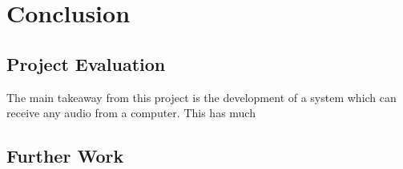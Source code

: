 \documentclass[main.tex]{subfiles}
\begin{document}
\chapter{Conclusion}
\section{Project Evaluation}
The main takeaway from this project is the development of a system which can receive any audio from a computer.
This has much 
\section{Further Work}
\end{document}
